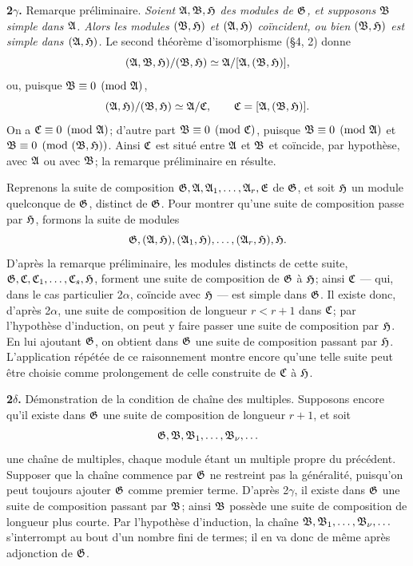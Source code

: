 \textbf{2$\gamma$.} Remarque préliminaire. \emph{Soient $\mathfrak{A},\mathfrak{B},\mathfrak{H}$ des modules de $\mathfrak{G}$, et supposons $\mathfrak{B}$ simple dans $\mathfrak{A}$. Alors les modules $(\mathfrak{B},\mathfrak{H})$ et $(\mathfrak{A},\mathfrak{H})$ coïncident, ou bien $(\mathfrak{B},\mathfrak{H})$ est simple dans $(\mathfrak{A},\mathfrak{H})$.} Le second théorème d'isomorphisme (\S{}4, 2) donne
\[
        (\mathfrak{A},\mathfrak{B},\mathfrak{H})/(\mathfrak{B},\mathfrak{H})
        \simeq \mathfrak{A}/[\mathfrak{A},(\mathfrak{B},\mathfrak{H})],
\]
ou, puisque $\mathfrak{B}\equiv0\pmod{\mathfrak{A}}$,
\[
        (\mathfrak{A},\mathfrak{H})/(\mathfrak{B},\mathfrak{H})\simeq \mathfrak{A}/\mathfrak{C},
        \qquad
        \mathfrak{C}=[\mathfrak{A},(\mathfrak{B},\mathfrak{H})].
\]
On a $\mathfrak{C}\equiv0\pmod{\mathfrak{A}}$; d'autre part $\mathfrak{B}\equiv0\pmod{\mathfrak{C}}$, puisque $\mathfrak{B}\equiv0\pmod{\mathfrak{A}}$ et $\mathfrak{B}\equiv0\pmod{(\mathfrak{B},\mathfrak{H})}$. Ainsi $\mathfrak{C}$ est situé entre $\mathfrak{A}$ et $\mathfrak{B}$ et coïncide, par hypothèse, avec $\mathfrak{A}$ ou avec $\mathfrak{B}$; la remarque préliminaire en résulte.

Reprenons la suite de composition $\mathfrak{G},\mathfrak{A},\mathfrak{A}_1,\ldots,\mathfrak{A}_r,\mathfrak{E}$ de $\mathfrak{G}$, et soit $\mathfrak{H}$ un module quelconque de $\mathfrak{G}$, distinct de $\mathfrak{G}$. Pour montrer qu'une suite de composition passe par $\mathfrak{H}$, formons la suite de modules
\[
        \mathfrak{G},(\mathfrak{A},\mathfrak{H}),(\mathfrak{A}_1,\mathfrak{H}),\ldots,(\mathfrak{A}_r,\mathfrak{H}),\mathfrak{H}.
\]
D'après la remarque préliminaire, les modules distincts de cette suite, $\mathfrak{G},\mathfrak{C},\mathfrak{C}_1,\ldots,\mathfrak{C}_s,\mathfrak{H}$, forment une suite de composition de $\mathfrak{G}$ à $\mathfrak{H}$; ainsi $\mathfrak{C}$ --- qui, dans le cas particulier 2$\alpha$, coïncide avec $\mathfrak{H}$ --- est simple dans $\mathfrak{G}$. Il existe donc, d'après 2$\alpha$, une suite de composition de longueur $r<r+1$ dans $\mathfrak{C}$; par l'hypothèse d'induction, on peut y faire passer une suite de composition par $\mathfrak{H}$. En lui ajoutant $\mathfrak{G}$, on obtient dans $\mathfrak{G}$ une suite de composition passant par $\mathfrak{H}$. L'application répétée de ce raisonnement montre encore qu'une telle suite peut être choisie comme prolongement de celle construite de $\mathfrak{C}$ à $\mathfrak{H}$.

\textbf{2$\delta$.} Démonstration de la condition de chaîne des multiples. Supposons encore qu'il existe dans $\mathfrak{G}$ une suite de composition de longueur $r+1$, et soit
\[
        \mathfrak{G},\mathfrak{B},\mathfrak{B}_1,\ldots,\mathfrak{B}_\nu,\ldots
\]
une chaîne de multiples, chaque module étant un multiple propre du précédent. Supposer que la chaîne commence par $\mathfrak{G}$ ne restreint pas la généralité, puisqu'on peut toujours ajouter $\mathfrak{G}$ comme premier terme. D'après 2$\gamma$, il existe dans $\mathfrak{G}$ une suite de composition passant par $\mathfrak{B}$; ainsi $\mathfrak{B}$ possède une suite de composition de longueur plus courte. Par l'hypothèse d'induction, la chaîne $\mathfrak{B},\mathfrak{B}_1,\ldots,\mathfrak{B}_\nu,\ldots$ s'interrompt au bout d'un nombre fini de termes; il en va donc de même après adjonction de $\mathfrak{G}$.

